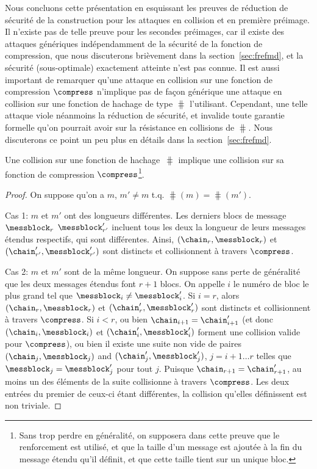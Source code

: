 Nous concluons cette présentation en esquissant les preuves de réduction de sécurité de la construction \merkdam pour les attaques en collision
et en première préimage. Il n'existe pas de telle preuve pour les secondes préimages, car il existe des attaques génériques indépendamment
de la sécurité de la fonction de compression, que nous discuterons brièvement dans la section~\ref{sec:frefmd}, et la sécurité (sous-optimale) exactement
atteinte n'est pas connue.
Il est aussi important de remarquer qu'une attaque en collision sur une fonction de compression $\compress$ n'implique pas de façon
générique une attaque en collision sur
une fonction de hachage de type \merkdam $\hash$ l'utilisant. Cependant, une telle attaque viole néanmoins la réduction de sécurité, et invalide toute garantie
formelle qu'on pourrait avoir sur la résistance en collisions de $\hash$. Nous discuterons ce point un peu plus en détails dans la section~\ref{sec:frefmd}.

\begin{prop}
Une collision sur une fonction de hachage \merkdam $\hash$ implique une collision sur sa fonction de compression
$\compress$\footnote{Sans trop perdre en généralité, on supposera dans cette preuve que le renforcement \merkdam est utilisé, et que la taille
d'un message est ajoutée à la fin du message étendu qu'il définit, et que cette taille tient sur un unique bloc.}.
\end{prop}
\begin{proof}
On suppose qu'on a
$m$, $m' \neq m$ t.q. $\hash(m) = \hash(m')$.

Cas 1: $m$ et $m'$ ont des longueurs différentes.
Les derniers blocs de message $\messblock_r$
$\messblock'_{r'}$ incluent tous les deux la longueur de leurs messages étendus respectifs, qui sont différentes.
Ainsi,
$(\chain_r,\messblock_r)$ et $(\chain'_{r'}, \messblock'_{r'})$ sont distincts et collisionnent à travers $\compress$.

Cas 2: $m$ et $m'$
sont de la même longueur.
On suppose sans perte de généralité que les deux messages étendus font
$r + 1$ blocs.
On appelle $i$ le numéro de bloc le plus grand tel que
$\messblock_{i} \neq \messblock'_{i}$.
Si 
$i = r$, alors $(\chain_r,\messblock_r)$ et $(\chain'_{r}, \messblock'_{r})$
sont distincts et collisionnent à travers
$\compress$.
Si
$i < r$, ou bien $\chain_{i+1} = \chain'_{i+1}$ (et donc $(\chain_i,\messblock_i)$ et $(\chain'_{i}, \messblock'_{i})$
forment une collision valide  pour $\compress$), ou bien il existe une suite non vide de paires $(\chain_j, \messblock_j)$ and $(\chain'_j, \messblock'_j)$,
$j = i+1\ldots r$ telles que $\messblock_j = \messblock'_j$ pour tout $j$.
Puisque $\chain_{r+1} = \chain'_{r+1}$, au moins un des éléments de la suite collisionne à travers
$\compress$. Les deux entrées du premier de ceux-ci étant différentes, la collision qu'elles définissent est non triviale.
\end{proof}

